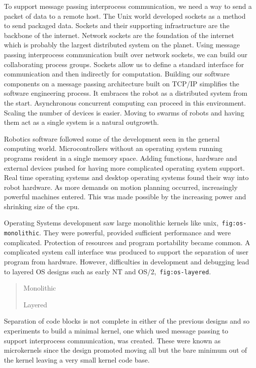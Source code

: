 To support message passing interprocess communication, we need a way to
send a packet of data to a remote host. The Unix world developed sockets
as a method to send packaged data. Sockets and their supporting
infrastructure are the backbone of the internet. Network sockets are the
foundation of the internet which is probably the largest distributed
system on the planet. Using message passing interprocess communication
built over network sockets, we can build our collaborating process
groups. Sockets allow us to define a standard interface for
communication and then indirectly for computation. Building our software
components on a message passing architecture built on TCP/IP simplifies
the software engineering process. It embraces the robot as a distributed
system from the start. Asynchronous concurrent computing can proceed in
this environment. Scaling the number of devices is easier. Moving to
swarms of robots and having them act as a single system is a natural
outgrowth.

Robotics software followed some of the development seen in the general
computing world. Microcontrollers without an operating system running
programs resident in a single memory space. Adding functions, hardware
and external devices pushed for having more complicated operating system
support. Real time operating systems and desktop operating systems found
their way into robot hardware. As more demands on motion planning
occurred, increasingly powerful machines entered. This was made possible
by the increasing power and shrinking size of the cpu.

Operating Systems development saw large monolithic kernels like
unix,~\texttt{fig:os-monolithic}. They were powerful, provided
sufficient performance and were complicated. Protection of resources and
program portability became common. A complicated system call interface
was produced to support the separation of user program from hardware.
However, difficulties in development and debugging lead to layered OS
designs such as early NT and OS/2,~\texttt{fig:os-layered}.

\begin{quote}
Monolithic

Layered
\end{quote}

Separation of code blocks is not complete in either of the previous
designs and so experiments to build a minimal kernel, one which used
message passing to support interprocess communication, was created.
These were known as microkernels since the design promoted moving all
but the bare minimum out of the kernel leaving a very small kernel code
base.

